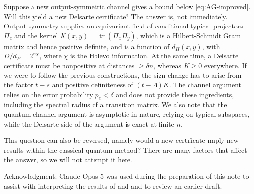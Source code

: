 \documentclass[11pt]{amsart}
\theoremstyle{plain}
\theoremstyle{remark}
\newcommand{\tr}{\operatorname{tr}}
\begin{document}
\subsubsection{}
Suppose a new output-symmetric channel gives a bound below
\eqref{eq:AG-improved}. Will this yield a new Delsarte certificate? The answer is, not immediately. Output symmetry supplies  an equivariant field of conditional typical projectors $\Pi_c$ and the kernel
$K(x,y)=\tr(\Pi_x\Pi_y)$, which is a Hilbert-Schmidt Gram matrix and hence positive definite,  and is a function of $d_H(x,y)$, with $D/d_E=2^{n\chi}$, where $\chi$ is the Holevo information. At the same time, a Delsarte certificate must be nonpositive at distances $\ge\delta n$, whereas $K\ge0$ everywhere. If we were to follow the previous constructions, the sign change has to arise from the factor $t-s$ and positive definiteness of $(t-\Lambda)K$. The channel argument relies on the error probability $p_e<\delta$ and does not provide these ingredients, including the spectral radius of a transition matrix. 
We also note that the quantum channel argument is asymptotic in nature, relying on typical subspaces, while
the Delsarte side of the argument is exact at finite $n$.

This question can also be reversed, namely would a new certificate imply new results within the classical-quantum method? There are many factors that affect the answer, so we will not attempt it here.

\vspace*{.1in}
{\sc Acknowledgment:} Claude Opus 5 was used during the preparation of this note to assist with interpreting the results of \cite{OAI26} and \cite{AG26} and to review an earlier draft.
\end{document}
